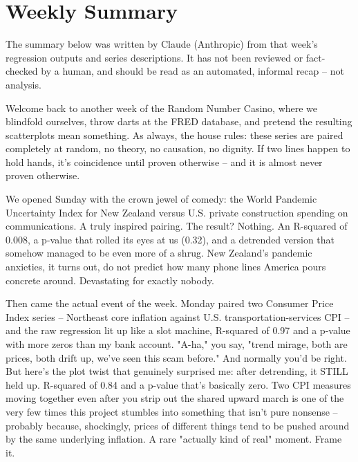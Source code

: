 \section{Weekly Summary}

\begin{tcolorbox}[colback=yellow!10,colframe=black!50,title=AI-Generated Content]
\noindent The summary below was written by Claude (Anthropic) from that week's regression outputs and series descriptions. It has not been reviewed or fact-checked by a human, and should be read as an automated, informal recap -- not analysis.
\end{tcolorbox}

Welcome back to another week of the Random Number Casino, where we blindfold ourselves, throw darts at the FRED database, and pretend the resulting scatterplots mean something. As always, the house rules: these series are paired completely at random, no theory, no causation, no dignity. If two lines happen to hold hands, it's coincidence until proven otherwise -- and it is almost never proven otherwise.

We opened Sunday with the crown jewel of comedy: the World Pandemic Uncertainty Index for New Zealand versus U.S. private construction spending on communications. A truly inspired pairing. The result? Nothing. An R-squared of 0.008, a p-value that rolled its eyes at us (0.32), and a detrended version that somehow managed to be even more of a shrug. New Zealand's pandemic anxieties, it turns out, do not predict how many phone lines America pours concrete around. Devastating for exactly nobody.

Then came the actual event of the week. Monday paired two Consumer Price Index series -- Northeast core inflation against U.S. transportation-services CPI -- and the raw regression lit up like a slot machine, R-squared of 0.97 and a p-value with more zeros than my bank account. "A-ha," you say, "trend mirage, both are prices, both drift up, we've seen this scam before." And normally you'd be right. But here's the plot twist that genuinely surprised me: after detrending, it STILL held up. R-squared of 0.84 and a p-value that's basically zero. Two CPI measures moving together even after you strip out the shared upward march is one of the very few times this project stumbles into something that isn't pure nonsense -- probably because, shockingly, prices of different things tend to be pushed around by the same underlying inflation. A rare "actually kind of real" moment. Frame it.

